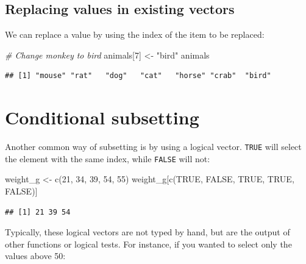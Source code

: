 \documentclass[
]{book}
\newenvironment{Shaded}{\begin{snugshade}}{\end{snugshade}}
\newcommand{\CommentTok}[1]{\textcolor[rgb]{0.56,0.35,0.01}{\textit{#1}}}
\newcommand{\ConstantTok}[1]{\textcolor[rgb]{0.00,0.00,0.00}{#1}}
\newcommand{\DecValTok}[1]{\textcolor[rgb]{0.00,0.00,0.81}{#1}}
\newcommand{\FunctionTok}[1]{\textcolor[rgb]{0.00,0.00,0.00}{#1}}
\newcommand{\NormalTok}[1]{#1}
\newcommand{\OtherTok}[1]{\textcolor[rgb]{0.56,0.35,0.01}{#1}}
\newcommand{\StringTok}[1]{\textcolor[rgb]{0.31,0.60,0.02}{#1}}
\begin{document}
\hypertarget{replacing-values-in-existing-vectors}{%
\subsection*{Replacing values in existing vectors}\label{replacing-values-in-existing-vectors}}

We can replace a value by using the index of the item to be replaced:

\begin{Shaded}
\begin{Highlighting}[]
\CommentTok{\# Change monkey to bird}
\NormalTok{animals[}\DecValTok{7}\NormalTok{] }\OtherTok{\textless{}{-}} \StringTok{"bird"}
\NormalTok{animals}
\end{Highlighting}
\end{Shaded}

\begin{verbatim}
## [1] "mouse" "rat"   "dog"   "cat"   "horse" "crab"  "bird"
\end{verbatim}

\hypertarget{conditional-subsetting}{%
\section{Conditional subsetting}\label{conditional-subsetting}}

Another common way of subsetting is by using a logical vector. \texttt{TRUE} will select the element with the same index, while \texttt{FALSE} will not:

\begin{Shaded}
\begin{Highlighting}[]
\NormalTok{weight\_g }\OtherTok{\textless{}{-}} \FunctionTok{c}\NormalTok{(}\DecValTok{21}\NormalTok{, }\DecValTok{34}\NormalTok{, }\DecValTok{39}\NormalTok{, }\DecValTok{54}\NormalTok{, }\DecValTok{55}\NormalTok{)}
\NormalTok{weight\_g[}\FunctionTok{c}\NormalTok{(}\ConstantTok{TRUE}\NormalTok{, }\ConstantTok{FALSE}\NormalTok{, }\ConstantTok{TRUE}\NormalTok{, }\ConstantTok{TRUE}\NormalTok{, }\ConstantTok{FALSE}\NormalTok{)]}
\end{Highlighting}
\end{Shaded}

\begin{verbatim}
## [1] 21 39 54
\end{verbatim}

Typically, these logical vectors are not typed by hand, but are the output of other functions or logical tests. For instance, if you wanted to select only the values above 50:
\end{document}
